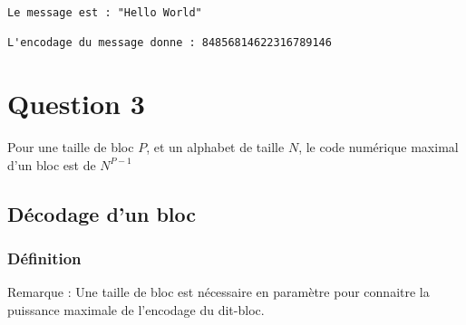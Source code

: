 \documentclass{report}
\newenvironment{code}%
   {\snugshade}%
   {\endsnugshade}
\begin{document}
   \begin{code}\begin{Verbatim}[commandchars=\\\{\}]
Le message est : "Hello World"

L'encodage du message donne : 84856814622316789146

    \end{Verbatim}
\end{code}

\section{\texorpdfstring{\textbf{Question
3}}{Question 3}}\label{question-3}

Pour une taille de bloc \(P\), et un alphabet de taille \(N\), le code
numérique maximal d'un bloc est de \(N^{P-1}\)

\subsection{\texorpdfstring{\textbf{Décodage d'un
bloc}}{Décodage d'un bloc}}\label{duxe9codage-dun-bloc}

\subsubsection{\texorpdfstring{\textbf{Définition}}{Définition}}\label{duxe9finition}

Remarque : Une taille de bloc est nécessaire en paramètre pour connaitre
la puissance maximale de l'encodage du dit-bloc.
\end{document}
